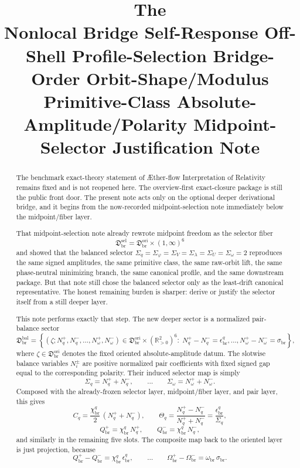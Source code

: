 \documentclass[11pt]{article}
\title{\textbf{The \TheoryName{}}\\[0.4em]
\large Nonlocal Bridge Self-Response Off-Shell Profile-Selection Bridge-Order Orbit-Shape/Modulus Primitive-Class Absolute-Amplitude/Polarity Midpoint-Selector Justification Note}
\author{}
\date{}
\newcommand{\Aflow}{\AE{}ther-flow}
\newcommand{\TheoryName}{\Aflow{} Interpretation of Relativity}
\newcommand{\OriginSector}{\mathfrak D_{\mathrm{br}}^{\mathrm{ori}}}
\newcommand{\AbsReadAmp}{\chi_{\mathrm{br}}^{q}}
\newcommand{\AbsScaleAmp}{\omega_{\mathrm{br}}}
\newcommand{\PolRead}{\epsilon_{\mathrm{br}}^{q}}
\newcommand{\PolScale}{\sigma_{\mathrm{br}}}
\newcommand{\PairReadPlus}{Q_{\mathrm{br}}^{+}}
\newcommand{\PairReadMinus}{Q_{\mathrm{br}}^{-}}
\newcommand{\PairScalePlus}{\Omega_{\mathrm{br}}^{+}}
\newcommand{\PairScaleMinus}{\Omega_{\mathrm{br}}^{-}}
\newcommand{\MidRead}{C_{q}}
\newcommand{\FiberRead}{\Theta_{q}}
\newcommand{\MidSelSector}{\mathfrak D_{\mathrm{br}}^{\mathrm{sel}}}
\newcommand{\SelRead}{\Sigma_{q}}
\newcommand{\SelCov}{\Sigma_{\varphi}}
\newcommand{\SelRelax}{\Sigma_{V}}
\newcommand{\SelWell}{\Sigma_{\lambda}}
\newcommand{\SelEq}{\Sigma_{U}}
\newcommand{\SelScale}{\Sigma_{\omega}}
\newcommand{\MidBalanceSector}{\mathfrak D_{\mathrm{br}}^{\mathrm{bal}}}
\newcommand{\BalReadPlus}{N_{q}^{+}}
\newcommand{\BalReadMinus}{N_{q}^{-}}
\newcommand{\BalScalePlus}{N_{\omega}^{+}}
\newcommand{\BalScaleMinus}{N_{\omega}^{-}}
\begin{document}
\maketitle

\begin{abstract}
The benchmark exact-theory statement of \TheoryName{} remains fixed and is not reopened here. The overview-first exact-closure package is still the public front door. The present note acts only on the optional deeper derivational bridge, and it begins from the now-recorded midpoint-selection note immediately below the midpoint/fiber layer.

That midpoint-selection note already rewrote midpoint freedom as the selector fiber
\[
\MidSelSector=\OriginSector\times(1,\infty)^{6}
\]
and showed that the balanced selector \(\SelRead=\SelCov=\SelRelax=\SelWell=\SelEq=\SelScale=2\) reproduces the same signed amplitudes, the same primitive class, the same raw-orbit lift, the same phase-neutral minimizing branch, the same canonical profile, and the same downstream package. But that note still chose the balanced selector only as the least-drift canonical representative. The honest remaining burden is sharper: derive or justify the selector itself from a still deeper layer.

This note performs exactly that step. The new deeper sector is a normalized pair-balance sector
\[
\MidBalanceSector
=
\left\{
(\zeta;\BalReadPlus,\BalReadMinus,\ldots,\BalScalePlus,\BalScaleMinus)
\in
\OriginSector\times(\mathbb R_{>0}^{2})^{6}
:\;
\BalReadPlus-\BalReadMinus=\PolRead,\ldots,\BalScalePlus-\BalScaleMinus=\PolScale
\right\},
\]
where \(\zeta\in\OriginSector\) denotes the fixed oriented absolute-amplitude datum. The slotwise balance variables \(N_i^{\pm}\) are positive normalized pair coefficients with fixed signed gap equal to the corresponding polarity. Their induced selector map is simply
\[
\SelRead=\BalReadPlus+\BalReadMinus,
\qquad
\ldots
\qquad
\SelScale=\BalScalePlus+\BalScaleMinus.
\]
Composed with the already-frozen selector layer, midpoint/fiber layer, and pair layer, this gives
\[
\MidRead=\frac{\AbsReadAmp}{2}\,(\BalReadPlus+\BalReadMinus),
\qquad
\FiberRead=\frac{\BalReadPlus-\BalReadMinus}{\BalReadPlus+\BalReadMinus}
=
\frac{\PolRead}{\SelRead},
\]
\[
\PairReadPlus=\AbsReadAmp\,\BalReadPlus,
\qquad
\PairReadMinus=\AbsReadAmp\,\BalReadMinus,
\]
and similarly in the remaining five slots. The composite map back to the oriented layer is just projection, because
\[
\PairReadPlus-\PairReadMinus=\AbsReadAmp\,\PolRead,
\qquad
\ldots
\qquad
\PairScalePlus-\PairScaleMinus=\AbsScaleAmp\,\PolScale.
\]


\end{abstract}
\end{document}

